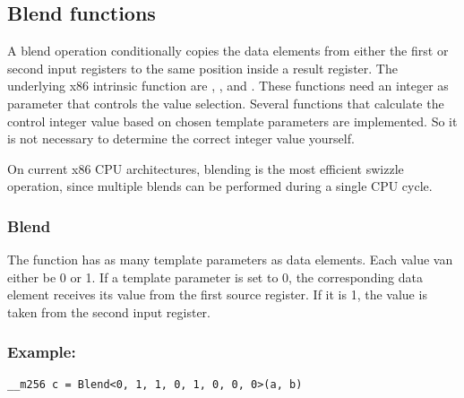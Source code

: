 \subsection{Blend functions}

A blend operation conditionally copies the data elements from either the first or second input registers to the same position inside a result register. 
The underlying x86 intrinsic function are , ,  and .
These functions need an integer as parameter that controls the value selection.
Several functions that calculate the control integer value based on chosen template parameters are implemented.
So it is not necessary to determine the correct integer value yourself.

On current x86 CPU architectures, blending is the most efficient swizzle operation, since multiple blends can be performed during a single CPU cycle.

\subsubsection{Blend}

The  function has as many template parameters as data elements.
Each value van either be 0 or 1.
If a template parameter is set to 0, the corresponding data element receives its value from the first source register.
If it is 1, the value is taken from the second input register.

\vspace{1cm}
\begin{minipage}{\linewidth}
\subsubsection*{Example:}
\begin{verbatim}
__m256 c = Blend<0, 1, 1, 0, 1, 0, 0, 0>(a, b)
\end{verbatim}

\end{minipage}


